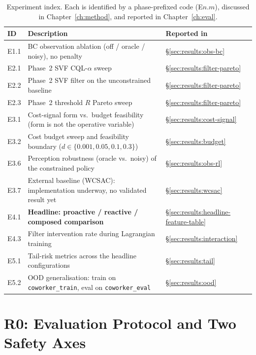 \documentclass[11pt,a4paper]{report}
\begin{document}
\begin{table}[h]
\centering
\caption{Experiment index. Each is identified by a phase-prefixed
code (E$n.m$), discussed in Chapter~\ref{ch:method}, and reported in
Chapter~\ref{ch:eval}.}
\label{tab:experiment-index}
\small
\begin{tabular}{lll}
\toprule
ID & Description & Reported in \\
\midrule
E1.1   & BC observation ablation (off / oracle / noisy), no penalty
       & \S\ref{sec:results:obs-bc} \\
E2.1   & Phase~2 SVF CQL-$\alpha$ sweep
       & \S\ref{sec:results:filter-pareto} \\
E2.2   & Phase~2 SVF filter on the unconstrained baseline
       & \S\ref{sec:results:filter-pareto} \\
E2.3   & Phase~2 threshold $R$ Pareto sweep
       & \S\ref{sec:results:filter-pareto} \\
E3.1   & Cost-signal form vs.\ budget feasibility (form is not the operative variable)
       & \S\ref{sec:results:cost-signal} \\
E3.2   & Cost budget sweep and feasibility boundary ($d \in \{0.001, 0.05, 0.1, 0.3\}$)
       & \S\ref{sec:results:budget} \\
E3.6   & Perception robustness (oracle vs.\ noisy) of the constrained policy
       & \S\ref{sec:results:obs-rl} \\
E3.7   & External baseline (WCSAC): implementation underway, no validated result yet
       & \S\ref{sec:results:wcsac} \\
E4.1   & \textbf{Headline: proactive / reactive / composed comparison}
       & \S\ref{sec:results:headline-feature-table} \\
E4.3   & Filter intervention rate during Lagrangian training
       & \S\ref{sec:results:interaction} \\
E5.1   & Tail-risk metrics across the headline configurations
       & \S\ref{sec:results:tail} \\
E5.2   & OOD generalisation: train on \texttt{coworker\_train}, eval on \texttt{coworker\_eval}
       & \S\ref{sec:results:ood} \\
\bottomrule
\end{tabular}
\end{table}


\section{R0: Evaluation Protocol and Two Safety Axes}
\label{sec:results:baseline}
\label{sec:results:two-axes}
\end{document}

